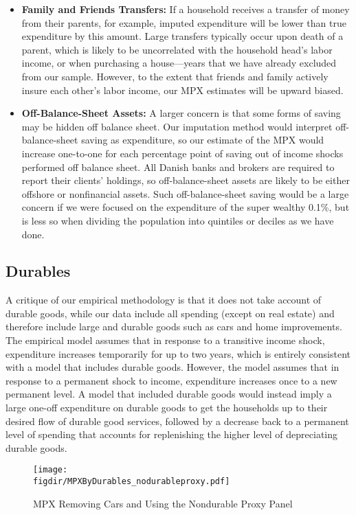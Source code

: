 \documentclass[titlepage]{\econtex}\newcommand{\texname}{ConsumptionHeterogeneity}
\newcommand{\figdir}{../Code/Rcode/Figures/AEJ_revision}
\begin{document}
\begin{itemize}
		\item \textbf{Family and Friends Transfers:} If a household receives a transfer of money from their parents, for example, imputed expenditure will be lower than true expenditure by this amount. Large transfers typically occur upon death of a parent, which is likely to be uncorrelated with the household head's labor income, or when purchasing a house---years that we have already excluded from our sample. However, to the extent that friends and family actively insure each other's labor income, our MPX estimates will be upward biased.
		\item \textbf{Off-Balance-Sheet Assets:} A larger concern is that some forms of saving may be hidden off balance sheet. Our imputation method would interpret off-balance-sheet saving as expenditure, so our estimate of the MPX would increase one-to-one for each percentage point of saving out of income shocks performed off balance sheet. All Danish banks and brokers are required to report their clients' holdings, so off-balance-sheet assets are likely to be either offshore or nonfinancial assets. Such off-balance-sheet saving would be a large concern if we were focused on the expenditure of the super wealthy 0.1\%, but is less so when dividing the population into quintiles or deciles as we have done. 
	\end{itemize}
	
	\subsection{Durables} \label{durables}
	A critique of our empirical methodology is that it does not take account of durable goods, while our data include all spending (except on real estate) and therefore include large and durable goods such as cars and home improvements. The empirical model assumes that in response to a transitive income shock, expenditure increases temporarily for up to two years, which is entirely consistent with a model that includes durable goods. However, the model assumes that in response to a permanent shock to income, expenditure increases once to a new permanent level. A model that included durable goods would instead imply a large one-off expenditure on durable goods to get the households up to their desired flow of durable good services, followed by a decrease back to a permanent level of spending that accounts for replenishing the higher level of depreciating durable goods.
	\begin{figure} 
		\begin{centering}
			\texttt{[image: \\figdir/MPXByDurables\_nodurableproxy.pdf]}
			\caption{MPX Removing Cars and Using the Nondurable Proxy Panel}
			\label{fig:MPXByDurables}
		\end{centering}
	\end{figure}
	
\end{document}
